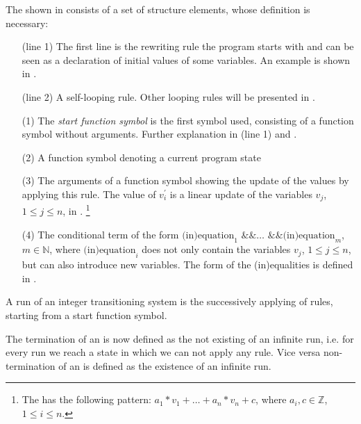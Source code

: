 The \its shown in  consists of a set of structure elements, whose definition is necessary:
\begin{enumerate}[leftmargin=1]
	\item[(line 1)] The first line is the rewriting rule the program starts with and can be seen as a declaration of initial values of some variables. An example is shown in .
	\item[(line 2)] A self-looping rule. Other looping rules will be presented in .
	\item[(1)] The \textit{start function symbol} is the first symbol used, consisting of a function symbol without arguments. Further explanation in (line 1) and .
	\item[(2)] A function symbol denoting a current program state
	\item[(3)] The arguments of a function symbol showing the update of the values by applying this rule. The value of $v^\prime_i$ is a linear update of the variables $v_j$, $1 \le j \le n$, in \stdLinInt. \footnote{The \stdLinInt has the following pattern: $ a_1*v_1 + \dots + a_n*v_n + c$, where $a_i , c \in \mathbb{Z}$, $1 \le i\le n$. }
	\item[(4)] The conditional term of the form $\text{(in)equation}_1 \text{ \&\& } \dots \text{ \&\& } \text{(in)equation}_m$, $m \in \mathbb{N}$, where $\text{(in)equation}_i$ does not only contain the variables $v_j$, $1 \le j \le n$, but can also introduce new variables. The form of the (in)equalities is defined in .	
\end{enumerate} 

\begin{definition}[run]
	A run of an integer transitioning system is the successively applying of rules, starting from a start function symbol.
\end{definition}

The termination of an \its is now defined as the not existing of an infinite run, i.e. for every run we reach a state in which we can not apply any rule. Vice versa non-termination of an \its is defined as the existence of an infinite run.



